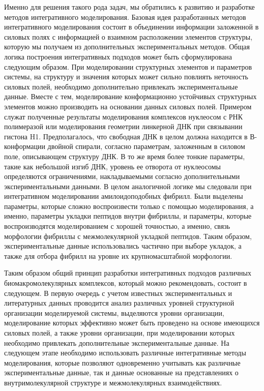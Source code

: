 Именно для решения такого рода задач, мы обратились к развитию и разработке методов интегративного моделирования. Базовая идея разработанных методов интегративного моделирования состоит в объединении информации заложенной в силовых полях с информацией о взаимном расположении элементов структуры, которую мы получаем из дополнительных экспериментальных методов.
Общая логика построения интегративных подходов может быть сформулирована следующим образом. При моделировании структурных элементов и параметров системы, на структуру и значения которых  может сильно повлиять неточность силовых полей, необходимо дополнительно привлекать экспериментальные данные. Вместе с тем, моделирование конформационно устойчивых структурных элементов можно производить на основании данных силовых полей. Примером служат полученные результаты моделирования комплексов нуклеосом с РНК полимеразой или моделирования геометрии линкерной ДНК при связывании гистона H1. Предполагалось, что свободная ДНК в целом должна находится в В-конформации двойной спирали, согласно параметрам, заложенным в силовом поле, описывающем структуру ДНК. В то же время более тонкие параметры, такие как небольшой изгиб ДНК, уровень ее отворота от нуклеосомы определяются ограничениями, накладываемыми согласно дополнительными экспериментальными данными. 
В целом аналогичной логике мы следовали при интегративном моделировании амилоидоподобных фибрилл. Были выделены параметры, которые сложно воспроизвести только с помощью моделирования, а именно, параметры укладки пептидов внутри фибриллы, и параметры, которые воспроизводятся моделированием с хорошей точностью, а именно, связь морфологии фибриллы с межмолекулярной укладкой пептидов. Таким образом, экспериментальные данные использовались частично при выборе укладок, а также для отбора фибрилл на уровне их крупномасштабной морфологии.

Таким образом общий принцип разработки интегративных подходов различных биомакромолекулярных комплексов, который можно рекомендовать, состоит в следующем. В первую очередь с учетом известных экспериментальных и литературных данных проводится анализ различных уровней структурной организации моделируемой системы, выделяются уровни организации, моделирование которых эффективно может быть проведено на основе имеющихся силовых полей, а также уровни организации, при моделировании которых необходимо привлекать дополнительные экспериментальные данные. На следующем этапе необходимо использовать различные интегративные методы моделирования, которые позволяют одновременно учитывать как различные экспериментальные данные, так и данные основанные на представлениях о внутримолекулярной структуре и межмолекулярных взаимодействиях. 

